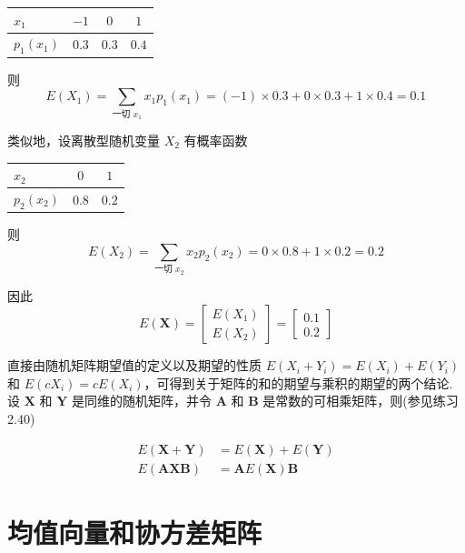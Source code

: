 
\begin{mvtable}
\begin{tabular}{lccc}
\toprule
$x_1$ & $-1$ & $0$ & $1$ \\
\midrule
$p_1(x_1)$ & $0.3$ & $0.3$ & $0.4$ \\
\bottomrule
\end{tabular}
\end{mvtable}

则
\[
E(X_1)=\sum_{\text{一切 }x_1}x_1p_1(x_1)=(-1)\times0.3+0\times0.3+1\times0.4=0.1
\]

类似地，设离散型随机变量 $X_2$ 有概率函数

\begin{mvtable}
\begin{tabular}{lcc}
\toprule
$x_2$ & $0$ & $1$ \\
\midrule
$p_2(x_2)$ & $0.8$ & $0.2$ \\
\bottomrule
\end{tabular}
\end{mvtable}

则
\[
E(X_2)=\sum_{\text{一切 }x_2}x_2p_2(x_2)=0\times0.8+1\times0.2=0.2
\]

因此
\[
E(\bm{X})=
\begin{bmatrix}
E(X_1)\\
E(X_2)
\end{bmatrix}
=
\begin{bmatrix}
0.1\\
0.2
\end{bmatrix}
\]

直接由随机矩阵期望值的定义以及期望的性质 $E(X_i+Y_i)=E(X_i)+E(Y_i)$ 和 $E(cX_i)=cE(X_i)$，可得到关于矩阵的和的期望与乘积的期望的两个结论.设 $\bm{X}$ 和 $\bm{Y}$ 是同维的随机矩阵，并令 $\bm{A}$ 和 $\bm{B}$ 是常数的可相乘矩阵，则(参见练习 2.40)

\begin{mvframe}
\label{eq:2-24}
\begin{equation}
\begin{aligned}
E(\bm{X}+\bm{Y})&=E(\bm{X})+E(\bm{Y})\\
E(\bm{A}\bm{X}\bm{B})&=\bm{A}E(\bm{X})\bm{B}
\end{aligned}
\tag{2-24}
\end{equation}
\end{mvframe}

\section{均值向量和协方差矩阵}  %
\label{sec:2.6}

